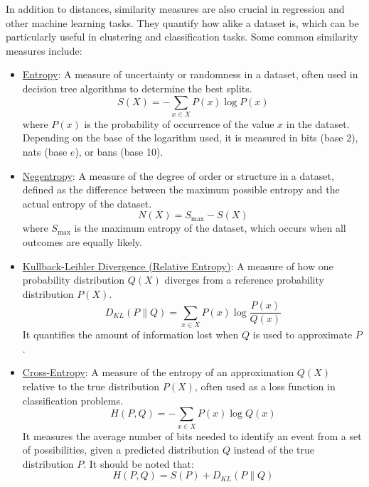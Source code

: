In addition to distances, similarity measures are also crucial in regression and other machine learning tasks. They quantify how alike a dataset is, which can be particularly useful in clustering and classification tasks. Some common similarity measures include:
\begin{itemize}
    \item \ul{Entropy}: A measure of uncertainty or randomness in a dataset, often used in decision tree algorithms to determine the best splits.
    \begin{equation*}
        S(X) = -\sum_{x\in X} P(x) \log P(x)
    \end{equation*}
    where $P(x)$ is the probability of occurrence of the value $x$ in the dataset. Depending on the base of the logarithm used, it is measured in bits (base 2), nats (base $e$), or bans (base 10).

    \item \ul{Negentropy}: A measure of the degree of order or structure in a dataset, defined as the difference between the maximum possible entropy and the actual entropy of the dataset.
    \begin{equation*}
        N(X) = S_{\text{max}} - S(X)
    \end{equation*}
    where $S_{\text{max}}$ is the maximum entropy of the dataset, which occurs when all outcomes are equally likely.

    \item \ul{Kullback-Leibler Divergence (Relative Entropy)}: A measure of how one probability distribution $Q(X)$ diverges from a reference probability distribution $P(X)$.
    \begin{equation*}
        D_{KL}(P \| Q) = \sum_{x\in X} P(x) \log \frac{P(x)}{Q(x)}
    \end{equation*}
    It quantifies the amount of information lost when $Q$ is used to approximate $P$.

    \item \ul{Cross-Entropy}: A measure of the entropy of an approximation $Q(X)$ relative to the true distribution $P(X)$, often used as a loss function in classification problems.
    \begin{equation*}
        H(P, Q) = -\sum_{x\in X} P(x) \log Q(x)
    \end{equation*}
    It measures the average number of bits needed to identify an event from a set of possibilities, given a predicted distribution $Q$ instead of the true distribution $P$. It should be noted that:
    \begin{equation*}
        H(P, Q) = S(P) + D_{KL}(P \| Q)
    \end{equation*}
    

\end{itemize}
